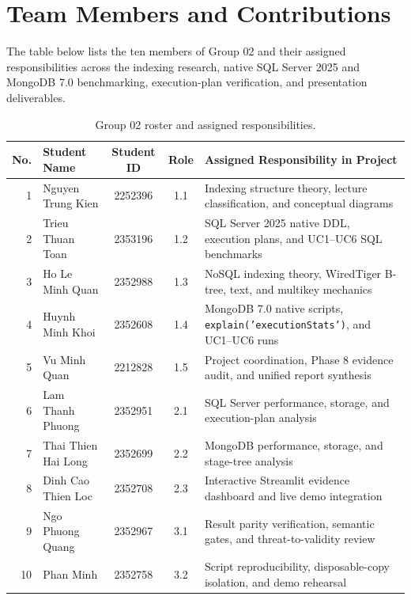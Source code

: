 \chapter*{Team Members and Contributions}
\noindent\small The table below lists the ten members of Group 02 and their assigned responsibilities across the indexing research, native SQL Server 2025 and MongoDB 7.0 benchmarking, execution-plan verification, and presentation deliverables.
\begin{table}[H]
\centering\footnotesize
\setlength{\tabcolsep}{3.5pt}
\begin{tabularx}{\linewidth}{@{}r l c c >{\raggedright\arraybackslash}X@{}}
\toprule
No. & Student Name & Student ID & Role & Assigned Responsibility in Project\\
\midrule
1 & Nguyen Trung Kien & 2252396 & 1.1 & Indexing structure theory, lecture classification, and conceptual diagrams\\
2 & Trieu Thuan Toan & 2353196 & 1.2 & SQL Server 2025 native DDL, execution plans, and UC1--UC6 SQL benchmarks\\
3 & Ho Le Minh Quan & 2352988 & 1.3 & NoSQL indexing theory, WiredTiger B-tree, text, and multikey mechanics\\
4 & Huynh Minh Khoi & 2352608 & 1.4 & MongoDB 7.0 native scripts, \texttt{explain('executionStats')}, and UC1--UC6 runs\\
5 & Vu Minh Quan & 2212828 & 1.5 & Project coordination, Phase 8 evidence audit, and unified report synthesis\\
6 & Lam Thanh Phuong & 2352951 & 2.1 & SQL Server performance, storage, and execution-plan analysis\\
7 & Thai Thien Hai Long & 2352699 & 2.2 & MongoDB performance, storage, and stage-tree analysis\\
8 & Dinh Cao Thien Loc & 2352708 & 2.3 & Interactive Streamlit evidence dashboard and live demo integration\\
9 & Ngo Phuong Quang & 2352967 & 3.1 & Result parity verification, semantic gates, and threat-to-validity review\\
10 & Phan Minh & 2352758 & 3.2 & Script reproducibility, disposable-copy isolation, and demo rehearsal\\
\bottomrule
\end{tabularx}
\caption{Group 02 roster and assigned responsibilities.}
\end{table}
\clearpage
